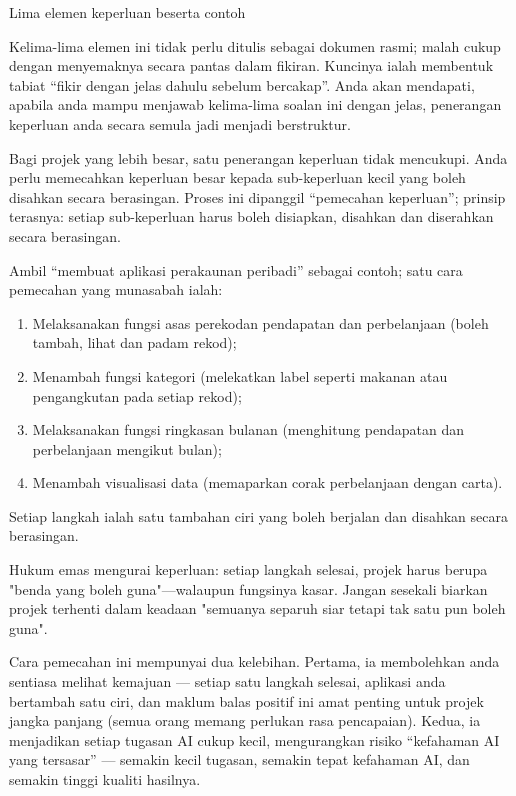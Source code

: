 \begin{center}\small\color{gray}Lima elemen keperluan beserta contoh\end{center}

Kelima-lima elemen ini tidak perlu ditulis sebagai dokumen rasmi; malah cukup dengan menyemaknya secara pantas dalam fikiran. Kuncinya ialah membentuk tabiat “fikir dengan jelas dahulu sebelum bercakap”. Anda akan mendapati, apabila anda mampu menjawab kelima-lima soalan ini dengan jelas, penerangan keperluan anda secara semula jadi menjadi berstruktur.


Bagi projek yang lebih besar, satu penerangan keperluan tidak mencukupi. Anda perlu memecahkan keperluan besar kepada sub-keperluan kecil yang boleh disahkan secara berasingan. Proses ini dipanggil “pemecahan keperluan”; prinsip terasnya: setiap sub-keperluan harus boleh disiapkan, disahkan dan diserahkan secara berasingan.

Ambil “membuat aplikasi perakaunan peribadi” sebagai contoh; satu cara pemecahan yang munasabah ialah:

\begin{enumerate}
  \item Melaksanakan fungsi asas perekodan pendapatan dan perbelanjaan (boleh tambah, lihat dan padam rekod);
  \item Menambah fungsi kategori (melekatkan label seperti makanan atau pengangkutan pada setiap rekod);
  \item Melaksanakan fungsi ringkasan bulanan (menghitung pendapatan dan perbelanjaan mengikut bulan);
  \item Menambah visualisasi data (memaparkan corak perbelanjaan dengan carta).
\end{enumerate}

Setiap langkah ialah satu tambahan ciri yang boleh berjalan dan disahkan secara berasingan.

Hukum emas mengurai keperluan: setiap langkah selesai, projek harus berupa "benda yang boleh guna"—walaupun fungsinya kasar. Jangan sesekali biarkan projek terhenti dalam keadaan "semuanya separuh siar tetapi tak satu pun boleh guna".

Cara pemecahan ini mempunyai dua kelebihan. Pertama, ia membolehkan anda sentiasa melihat kemajuan — setiap satu langkah selesai, aplikasi anda bertambah satu ciri, dan maklum balas positif ini amat penting untuk projek jangka panjang (semua orang memang perlukan rasa pencapaian). Kedua, ia menjadikan setiap tugasan AI cukup kecil, mengurangkan risiko “kefahaman AI yang tersasar” — semakin kecil tugasan, semakin tepat kefahaman AI, dan semakin tinggi kualiti hasilnya.

